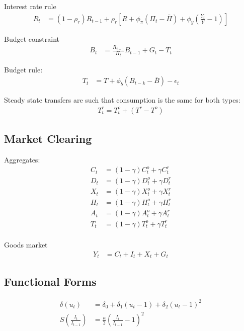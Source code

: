 \documentclass[11pt]{article}
\begin{document}
Interest rate rule
\begin{align*}
	R_t &= (1-\rho_r)R_{t-1} + \rho_r\left[R + \phi_\pi(\Pi_t-\bar{\Pi}) + \phi_y\left(\frac{Y_t}{\bar{Y}}-1\right)\right]
\end{align*}

Budget constraint
\begin{align*}
	B_t &= \frac{R_{t-1}}{\Pi_t}B_{t-1} + G_t - T_t
\end{align*}


Budget rule:
\begin{align*}
	T_t &= T + \phi_b(B_{t-k}-\bar{B}) - \epsilon_t
\end{align*}

Steady state transfers are such that consumption is the same for both types:
\begin{align*}
	T_t^r = T_t^o + (T^r - T^o)
\end{align*}

\subsection{Market Clearing}

Aggregates:
\begin{align*}
	C_t &= (1-\gamma) C_t^o + \gamma C_t^r \\
	D_t &= (1-\gamma) D_t^o + \gamma D_t^r \\
	X_t &= (1-\gamma) X_t^o + \gamma X_t^r \\
	H_t &= (1-\gamma) H_t^o + \gamma H_t^r \\
	A_t &= (1-\gamma) A_t^o + \gamma A_t^r \\
	T_t &= (1-\gamma) T_t^o + \gamma T_t^r \\
\end{align*}

Goods market
\begin{align*}
	Y_t &= C_t + I_t + X_t + G_t
\end{align*}


\subsection{Functional Forms}

\begin{align*}
	\delta(u_t) &= \delta_0 + \delta_1 (u_t-1) + \delta_2 (u_t-1)^2 \\
	S\left(\frac{I_t}{I_{t-1}}\right) &=\frac{\kappa}{2}\left(\frac{I_t}{I_{t-1}}-1\right)^{2}
\end{align*}
\end{document}
